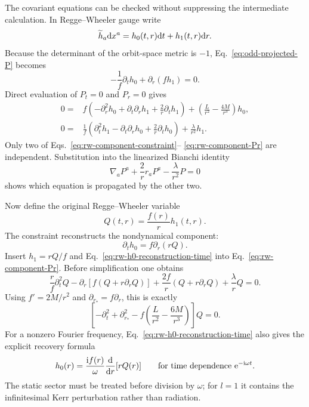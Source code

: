 The covariant equations can be checked without suppressing the intermediate
calculation.  In Regge--Wheeler gauge write
\begin{equation}
  \widetilde h_a\mathrm{d} x^a=h_0(t,r)\mathrm{d} t+h_1(t,r)\mathrm{d} r .
  \label{eq:rw-gauge-component-one-form}
\end{equation}
Because the determinant of the orbit-space metric is $-1$,
Eq.~\eqref{eq:odd-projected-P} becomes
\begin{equation}
  -\frac{1}{f}\partial_t h_0
  +\partial_r(fh_1)=0.
  \label{eq:rw-component-constraint}
\end{equation}
Direct evaluation of $P_t=0$ and $P_r=0$ gives
\begin{align}
  0={}&f\left(
  -\partial_r^2h_0+\partial_t\partial_rh_1
  +\frac{2}{r}\partial_th_1\right)
  +\left(\frac{L}{r^2}-\frac{4M}{r^3}\right)h_0,
  \label{eq:rw-component-Pt}\\
  0={}&\frac{1}{f}\left(
  \partial_t^2h_1-\partial_t\partial_rh_0
  +\frac{2}{r}\partial_th_0\right)
  +\frac{\lambda}{r^2}h_1.
  \label{eq:rw-component-Pr}
\end{align}
Only two of Eqs.~\eqref{eq:rw-component-constraint}--
\eqref{eq:rw-component-Pr} are independent.  Substitution into the
linearized Bianchi identity
\begin{equation}
  \nabla_aP^a+\frac{2}{r}r_aP^a
  -\frac{\lambda}{r^2}P=0
  \label{eq:odd-bianchi-component}
\end{equation}
shows which equation is propagated by the other two.

Now define the original Regge--Wheeler variable
\begin{equation}
  Q(t,r)=\frac{f(r)}{r}h_1(t,r).
  \label{eq:rw-Q-component-definition}
\end{equation}
The constraint reconstructs the nondynamical component:
\begin{equation}
  \partial_th_0=f\partial_r(rQ).
  \label{eq:rw-h0-reconstruction-time}
\end{equation}
Insert $h_1=rQ/f$ and Eq.~\eqref{eq:rw-h0-reconstruction-time} into
Eq.~\eqref{eq:rw-component-Pr}.  Before simplification one obtains
\begin{equation}
  \frac{r}{f}\partial_t^2Q
  -\partial_r\!\left[f(Q+r\partial_rQ)\right]
  +\frac{2f}{r}(Q+r\partial_rQ)
  +\frac{\lambda}{r}Q=0.
  \label{eq:rw-elimination-intermediate}
\end{equation}
Using $f'=2M/r^2$ and $\partial_{r_*}=f\partial_r$, this is exactly
\begin{equation}
  \left[-\partial_t^2+\partial_{r_*}^2
  -f\left(\frac{L}{r^2}-\frac{6M}{r^3}\right)\right]Q=0.
  \label{eq:rw-component-eliminated}
\end{equation}
For a nonzero Fourier frequency,
Eq.~\eqref{eq:rw-h0-reconstruction-time} also gives the explicit recovery
formula
\begin{equation}
  h_0(r)=\frac{\mathrm{i} f(r)}{\omega}
  \frac{\mathrm{d}}{\mathrm{d} r}[rQ(r)]
  \qquad
  \text{for time dependence }\mathrm{e}^{-\mathrm{i}\omega t}.
  \label{eq:rw-h0-frequency-reconstruction}
\end{equation}
The static sector must be treated before division by $\omega$; for $l=1$ it
contains the infinitesimal Kerr perturbation rather than radiation.

